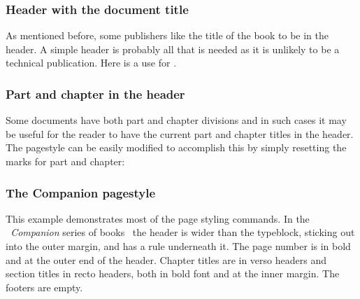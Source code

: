 \begin{plainlist}
\subsubsection{Header with the document title}

    As mentioned before, some publishers like the title of the book 
to be in the header. A simple header is probably all that is needed 
as it is unlikely to be a technical publication. Here is a
use for .
\begin{lcode}
\end{lcode}

\subsubsection{Part and chapter in the header}

    Some documents have both part and chapter divisions and in such
cases it may be useful for the reader to have the current part and chapter
titles in the header. The  pagestyle can be easily modified
to accomplish this by simply resetting the marks for part and chapter:
\begin{lcode}
\end{lcode}
  

\subsubsection{The Companion pagestyle}

    This example demonstrates most of the page styling commands.
In the \textit{\ltx\ Companion} series of 
books~\cite{COMPANION,GCOMPANION,WCOMPANION} the header is wider 
than the typeblock, sticking out into the outer 
margin, and has a rule underneath it. 
The page number is in 
bold and at the outer end of the header.
Chapter titles are in verso headers and section titles 
in recto headers, both in bold font and at the inner 
margin. The footers are empty.


\end{plainlist}
